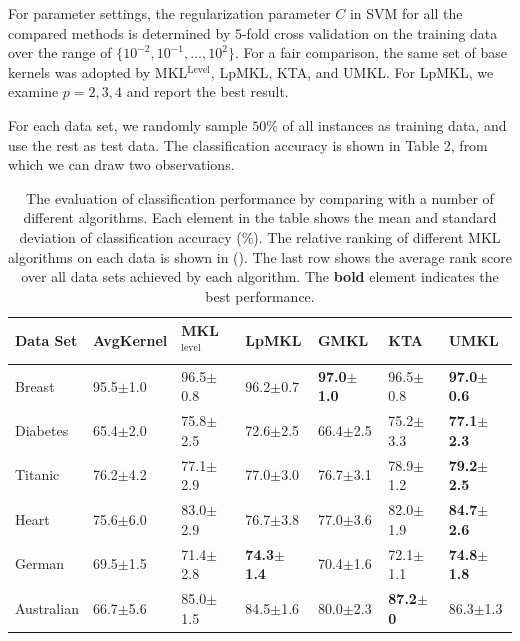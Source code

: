 For parameter settings, the regularization parameter $C$ in SVM for all the compared methods is determined by 5-fold cross validation on the training data over the range of $\{10^{-2}, 10^{-1}, \ldots, 10^2\}$. For a fair comparison, the same set of base kernels was adopted by MKL$^{\mathrm{Level}}$, LpMKL, KTA, and UMKL.  For LpMKL, we examine $p=2,3,4$ and report the best result.

For each data set, we randomly sample $50\%$ of all instances as training data, and use the rest as test data. The classification accuracy is shown in Table 2, from which we can draw two observations.


\begin{table}[!thbp] \label{table:acml-exp1-result}
\vspace{-0.1in} \centering \caption{The evaluation of classification performance by comparing with a number of different algorithms. Each element in the table shows the mean and standard deviation of classification accuracy (\%). The relative ranking of different MKL algorithms on each data is shown in (). The last row shows the average rank score over all data sets achieved by each algorithm. The {\bf bold} element indicates the best performance.}
\begin{center}
{%
\begin{tabular}{l|l|lllll}
\hline
Data Set  &AvgKernel & MKL$^{\mathrm{level}}$
    &LpMKL  &GMKL  &KTA &UMKL\\
\hline
\hline              %
Breast          &95.5$\pm$1.0      &96.5$\pm$0.8 &96.2$\pm$0.7  &{\bf 97.0$\pm$1.0}  &96.5$\pm$0.8 &{\bf 97.0$\pm$0.6}\\
Diabetes       &65.4$\pm$2.0  &75.8$\pm$2.5  &72.6$\pm$2.5 &66.4$\pm$2.5   &75.2$\pm$3.3 &{\bf 77.1$\pm$2.3}\\
Titanic         &76.2$\pm$4.2     &77.1$\pm$2.9    &77.0$\pm$3.0 &76.7$\pm$3.1       &78.9$\pm$1.2 &{\bf79.2$\pm$2.5}\\
Heart          &75.6$\pm$6.0    &83.0$\pm$2.9   &76.7$\pm$3.8 &77.0$\pm$3.6    &82.0$\pm$1.9 &{\bf 84.7$\pm$2.6}\\
German          &69.5$\pm$1.5   &71.4$\pm$2.8   &{\bf74.3$\pm$1.4} &70.4$\pm$1.6   &72.1$\pm$1.1 &{\bf74.8$\pm$1.8}\\
Australian     &66.7$\pm$5.6  &85.0$\pm$1.5  &84.5$\pm$1.6 &80.0$\pm$2.3 &{\bf 87.2$\pm$0} &86.3$\pm$1.3\\

\end{tabular}}
\end{center}
\end{table}
